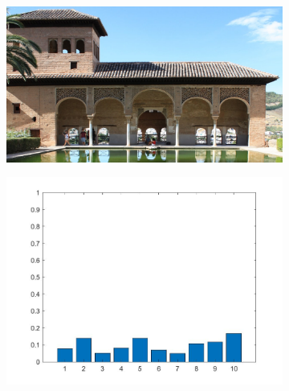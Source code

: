 \begin{figure}
     \centering
     \begin{subfigure}[b]{0.3\textwidth}
         \centering
         \includegraphics[width=\textwidth]{./figs/org009}
         \caption{}
         \label{}
     \end{subfigure}
     \hfill
     \begin{subfigure}[b]{0.3\textwidth}
         \centering
         \includegraphics[width=\textwidth]{./figs/simple_histogram}
         \caption{}
         \label{}
     \end{subfigure}
     \hfill
     \begin{subfigure}[b]{0.3\textwidth}
         \centering

\end{subfigure}
\end{figure}
